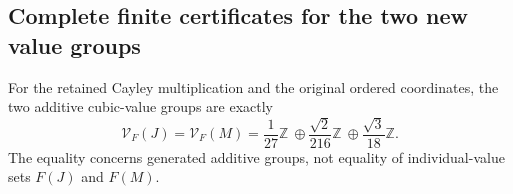 \subsection{Complete finite certificates for the two new value groups}

\begin{theorem}
\label{jmv:thm:JM-values}
For the retained Cayley multiplication and the original ordered
coordinates, the two additive cubic-value groups are exactly
\begin{equation}
 \mathcal V_F(J)=\mathcal V_F(M)
 =\frac1{27}\mathbb Z\ \oplus\frac{\sqrt2}{216}\mathbb Z
                         \ \oplus\frac{\sqrt3}{18}\mathbb Z.
 \label{jmv:eq:JM-values}
\end{equation}
The equality concerns generated additive groups, not equality
of individual-value sets \(F(J)\) and \(F(M)\).
\end{theorem}
